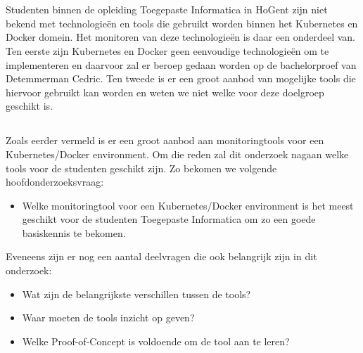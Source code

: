 \chapter{}
\label{ch:inleiding}


\section{}
\label{sec:probleemstelling}

Studenten binnen de opleiding Toegepaste Informatica in HoGent zijn niet bekend met technologieën en tools die gebruikt worden binnen het Kubernetes en Docker domein. Het monitoren van deze technologieën is daar een onderdeel van. Ten eerste zijn Kubernetes en Docker geen eenvoudige technologieën om te implementeren en daarvoor zal er beroep gedaan worden op de bachelorproef van Detemmerman Cedric. Ten tweede is er een groot aanbod van mogelijke tools die hiervoor gebruikt kan worden en weten we niet welke voor deze doelgroep geschikt is.


\section{}
\label{sec:onderzoeksvraag}

Zoals eerder vermeld is er een groot aanbod aan monitoringtools voor een Kubernetes/Docker environment. Om die reden zal dit onderzoek nagaan welke tools voor de studenten geschikt zijn. Zo bekomen we volgende hoofdonderzoeksvraag:

\begin{itemize}
    \item Welke monitoringtool voor een Kubernetes/Docker environment is het meest geschikt voor de studenten Toegepaste Informatica om zo een goede basiskennis te bekomen.
\end{itemize}

Eveneens zijn er nog een aantal deelvragen die ook belangrijk zijn in dit onderzoek:

\begin{itemize}
    \item Wat zijn de belangrijkste verschillen tussen de tools?
    \item Waar moeten de tools inzicht op geven?
    \item Welke Proof-of-Concept is voldoende om de tool aan te leren?
\end{itemize}

